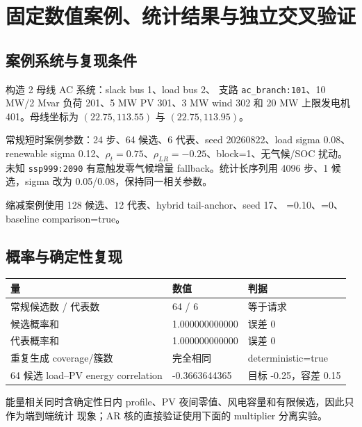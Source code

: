 \section{固定数值案例、统计结果与独立交叉验证}
\label{sec:scenario-numerical-validation}

\subsection{案例系统与复现条件}
 构造 2 母线 AC 系统：slack bus 1、load bus 2、
支路 \texttt{ac\_branch:101}、10 MW/2 Mvar 负荷 201、5 MW PV 301、3 MW wind 302 和
20 MW 上限发电机 401。母线坐标为 $(22.75,113.55)$ 与 $(22.75,113.95)$。

常规短时案例参数：24 步、64 候选、6 代表、seed 20260822、load sigma 0.08、renewable sigma
0.12、$\rho_t=0.75$、$\rho_{LR}=-0.25$、block=1、无气候/SOC 扰动。未知
\texttt{ssp999:2090} 有意触发零气候增量 fallback。统计长序列用 4096 步、1 候选，sigma 改为
0.05/0.08，保持同一相关参数。

缩减案例使用 128 候选、12 代表、hybrid tail-anchor、seed 17、
=0.10、=0、baseline comparison=true。

\subsection{概率与确定性复现}
\begin{center}\small
\begin{tabular}{@{}L{6.4cm}L{4.2cm}L{3.5cm}@{}}
\toprule
量 & 数值 & 判据\\
\midrule
常规候选数 / 代表数 & 64 / 6 & 等于请求\\
候选概率和 & 1.000000000000 & 误差 0\\
代表概率和 & 1.000000000000 & 误差 0\\
重复生成 coverage/簇数 & 完全相同 & deterministic=true\\
64 候选 load--PV energy correlation & -0.3663644365 & 目标 -0.25，容差 0.15\\
\bottomrule
\end{tabular}
\end{center}
能量相关同时含确定性日内 profile、PV 夜间零值、风电容量和有限候选，因此只作为端到端统计
现象；AR 核的直接验证使用下面的 multiplier 分离实验。


